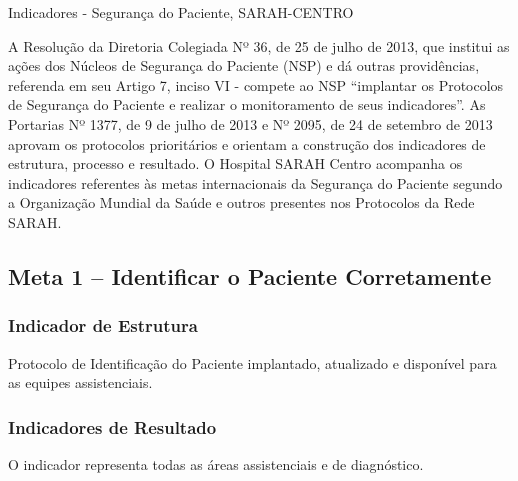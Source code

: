 \documentclass[
  a4paper]{article}
\author{}
\date{\vspace{-2.5em}}
\begin{document}

\begin{center}
 {\LARGE Indicadores - Segurança do Paciente, SARAH-CENTRO}
\end{center}
\vspace{0cm}

\hspace{1cm} A Resolução da Diretoria Colegiada Nº 36, de 25 de julho de
2013, que institui as ações dos Núcleos de Segurança do Paciente (NSP) e
dá outras providências, referenda em seu Artigo 7, inciso VI - compete
ao NSP ``implantar os Protocolos de Segurança do Paciente e realizar o
monitoramento de seus indicadores''. As Portarias Nº 1377, de 9 de julho
de 2013 e Nº 2095, de 24 de setembro de 2013 aprovam os protocolos
prioritários e orientam a construção dos indicadores de estrutura,
processo e resultado. O Hospital SARAH Centro acompanha os indicadores
referentes às metas internacionais da Segurança do Paciente segundo a
Organização Mundial da Saúde e outros presentes nos Protocolos da Rede
SARAH.

\subsection{Meta 1 – Identificar o Paciente Corretamente}

\subsubsection{Indicador de Estrutura}

Protocolo de Identificação do Paciente implantado, atualizado e
disponível para as equipes assistenciais.

\subsubsection{Indicadores de Resultado}

O indicador representa todas as áreas assistenciais e de diagnóstico.

\begin{table}[H]

\caption{\label{tab:unnamed-chunk-3}Número de eventos adversos devido a falhas na identificação do paciente, SARAH Centro}
\centering
{}
\end{table}
\end{document}
